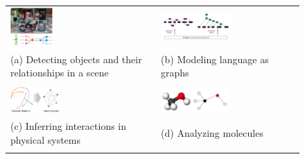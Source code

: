 \begin{figure}[tbhp]
    \vspace{-10pt}
    \centering
    \small
    \setlength{\tabcolsep}{1pt}
    \begin{tabular}{>{\centering\arraybackslash}p{}>{\centering\arraybackslash}p{}}
        \includegraphics[width=0.3\textwidth, align=c]{Ch1_Intro/motifs_scene_graph.pdf} & {\includegraphics[width=0.53\textwidth, align=c,trim={2cm 12.5cm 36cm 5cm},clip]{Ch1_Intro/graph-construction-v1.pdf}} \\
        (a) Detecting objects and their relationships in a scene~\citep{zellers2018neural} & (b) Modeling language as graphs~\citep{wu2021graph} \\ \\
        
        \includegraphics[width=0.35\textwidth, align=c]{Ch1_Intro/nri_physics_graph.pdf} & \includegraphics[width=0.5\textwidth, align=c]{Ch1_Intro/molecule_graph.png} \\
        (c) Inferring interactions in physical systems~\citep{kipf2018neural} & (d) Analyzing molecules~\citep{zhou2020graph} \\ \\
        

\end{tabular}
\end{figure}
